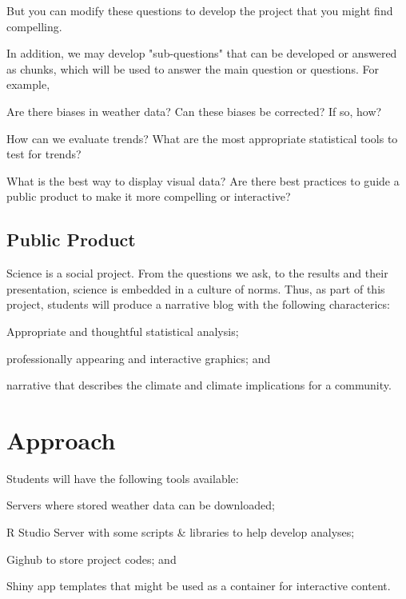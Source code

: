\documentclass{article}\usepackage[]{graphicx}\usepackage[]{color}
\newenvironment{itemize*}%
  {\begin{itemize}%
    \setlength{\itemsep}{0pt}%
    \setlength{\parskip}{0pt}}%
  {\end{itemize}}
\begin{document}
But you can modify these questions to develop the project that you might find compelling.

In addition, we may develop "sub-questions" that can be developed or answered as chunks, which will be used to answer the main question or questions. For example, 

\begin{itemize*}
  \item Are there biases in weather data? Can these biases be corrected? If so, how?
  \item How can we evaluate trends? What are the most appropriate statistical tools to test for trends?
  \item What is the best way to display visual data?  Are there best practices to guide a public product to make it more compelling or interactive?
\end{itemize*}

\subsection{Public Product}

Science is a social project. From the questions we ask, to the results and their presentation, science is embedded in a culture of norms. Thus, as part of this project, students will produce a narrative blog with the following characterics:

\begin{itemize*}
  \item Appropriate and thoughtful statistical analysis;
  \item professionally appearing and interactive graphics; and 
  \item narrative that describes the climate and climate implications for a community.
\end{itemize*}

\section{Approach}

Students will have the following tools available:

\begin{itemize*}
  \item Servers where stored weather data can be downloaded;
  \item R Studio Server with some scripts \& libraries to help develop analyses;
  \item Gighub to store project codes; and
  \item Shiny app templates that might be used as a container for interactive content.
\end{itemize*}
\end{document}
